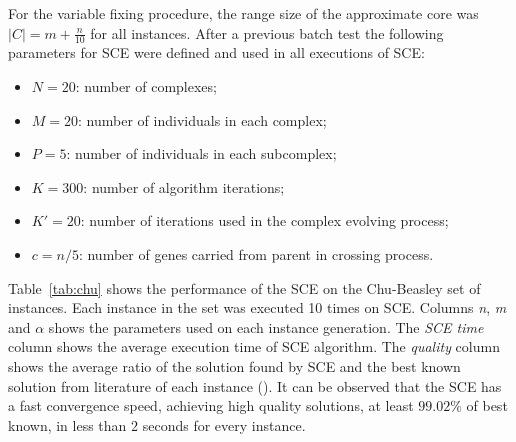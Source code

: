 For the variable fixing procedure, the range size of the approximate core was
$|C| = m+\frac{n}{10}$ for all instances.
After a previous batch test the following parameters for SCE were defined and used
in all executions of SCE:
\begin{itemize}
  \item $N = 20$: number of complexes;
  \item $M = 20$: number of individuals in each complex;
  \item $P = 5$: number of individuals in each subcomplex;
  \item $K = 300$: number of algorithm iterations;
  \item $K' = 20$: number of iterations used in the complex evolving process;
  \item $c = n/5$: number of genes carried from parent in crossing process.
\end{itemize}

Table~\ref{tab:chu} shows the performance of the SCE on the Chu-Beasley set of instances.
Each instance in the set was executed 10 times on SCE.
Columns \textit{n}, \textit{m} and \textit{$\alpha$} shows the parameters used
on each instance generation.
The \textit{SCE time} column shows the average execution time of SCE algorithm.
The \textit{quality} column shows the average ratio of the solution found by SCE and
the best known solution from literature of each instance (\cite{vimont2008reduced, della2012improved}).
It can be observed that the SCE has a fast convergence speed, achieving high
quality solutions, at least $99.02\%$ of best known, in less than $2$ seconds
for every instance.

